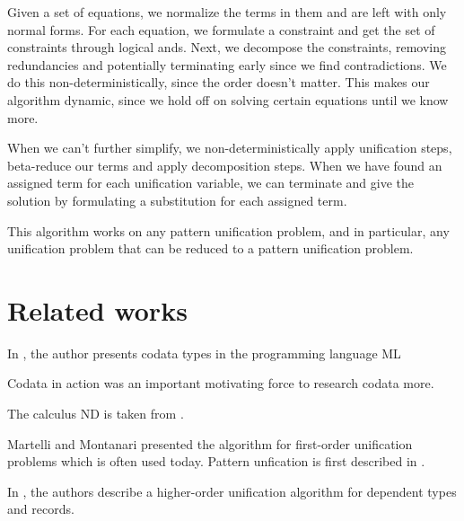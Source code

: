 \documentclass[twoside,12pt,a4paper]{article}
\begin{document}
Given a set of equations, we normalize the terms in them and are left with only normal forms. 
For each equation, we formulate a constraint and get the set of constraints through logical ands.
Next, we decompose the constraints, removing redundancies and potentially terminating early since we find contradictions.
We do this non-deterministically, since the order doesn't matter. %
This makes our algorithm dynamic, since we hold off on solving certain equations until we know more.

When we can't further simplify, we non-deterministically apply unification steps, beta-reduce our terms and apply decomposition steps.
When we have found an assigned term for each unification variable, we can terminate and give the solution
by formulating a substitution for each assigned term.

This algorithm works on any pattern unification problem, and in particular, any unification problem that can be reduced to a pattern unification problem. %

\section{Related works}\label{sec:Related works}

In \cite{HAGINO1989629}, the author presents codata types in the programming language ML

Codata in action \cite{10.1007/978-3-030-17184-1_5} was an important motivating force to research codata more.

The calculus ND is taken from \cite{binder2024programming}.

Martelli and Montanari presented the algorithm for first-order unification problems
which is often used today. \cite{10.1145/357162.357169}
Pattern unfication is first described in \cite{10.1093/logcom/1.4.497}.

In \cite{10.5555/2021953.2021960}, the authors describe a higher-order unification algorithm for dependent types and records.
\end{document}
